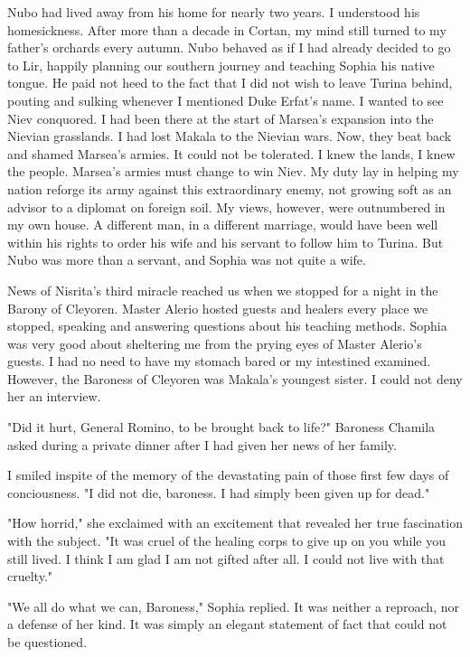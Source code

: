 \documentclass{article}
\begin{document}
Nubo had lived away from his home for nearly two years. I understood his homesickness. After more than a decade in Cortan, my mind still turned to my father's orchards every autumn. Nubo behaved as if I had already decided to go to Lir, happily planning our southern journey and teaching Sophia his native tongue. He paid not heed to the fact that I did not wish to leave Turina behind, pouting and sulking whenever I mentioned Duke Erfat's name. I wanted to see Niev conquored. I had been there at the start of Marsea's expansion into the Nievian grasslands. I had lost Makala to the Nievian wars. Now, they beat back and shamed Marsea's armies. It could not be tolerated. I knew the lands, I knew the people. Marsea's armies must change to win Niev. My duty lay in helping my nation reforge its army against this extraordinary enemy, not growing soft as an advisor to a diplomat on foreign soil. My views, however, were outnumbered in my own house. A different man, in a different marriage, would have been well within his rights to order his wife and his servant to follow him to Turina. But Nubo was more than a servant, and Sophia was not quite a wife. 

News of Nisrita's third miracle reached us when we stopped for a night in the Barony of Cleyoren. Master Alerio hosted guests and healers every place we stopped, speaking and answering questions about his teaching methods. Sophia was very good about sheltering me from the prying eyes of Master Alerio's guests. I had no need to have my stomach bared or my intestined examined. However, the Baroness of Cleyoren was Makala's youngest sister. I could not deny her an interview. 

"Did it hurt, General Romino, to be brought back to life?" Baroness Chamila asked during a private dinner after I had given her news of her family.

I smiled inspite of the memory of the devastating pain of those first few days of conciousness. "I did not die, baroness. I had simply been given up for dead." 

"How horrid," she exclaimed with an excitement that revealed her true fascination with the subject. "It was cruel of the healing corps to give up on you while you still lived. I think I am glad I am not gifted after all. I could not live with that cruelty."

"We all do what we can, Baroness," Sophia replied. It was neither a reproach, nor a defense of her kind. It was simply an elegant statement of fact that could not be questioned. 
\end{document}
